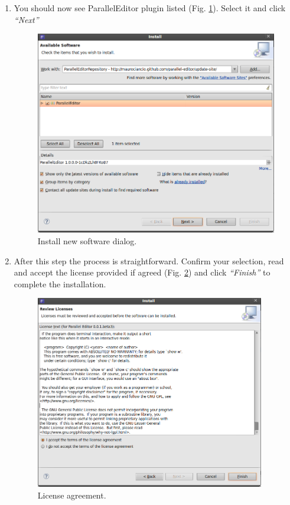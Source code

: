 \begin{enumerate}
\item
  You should now see ParallelEditor plugin listed (Fig. \ref{installsoftware}). Select it and
  click \emph{``Next''} 
  \begin{figure}[!ht]
	\begin{center}
		\includegraphics[width=12cm]{installsoftware.png}
		\caption{\label{installsoftware} Install new software dialog.}
	\end{center}
  \end{figure}

\item
  After this step the process is straightforward. Confirm your
  selection, read and accept the license provided if agreed (Fig. \ref{license}) and click
  \emph{``Finish''} to complete the installation.
  \begin{figure}[!ht]
	\begin{center}
		\includegraphics[width=10cm]{licence.png}
		\caption{\label{license} License agreement.}
	\end{center}
  \end{figure}

\end{enumerate}

